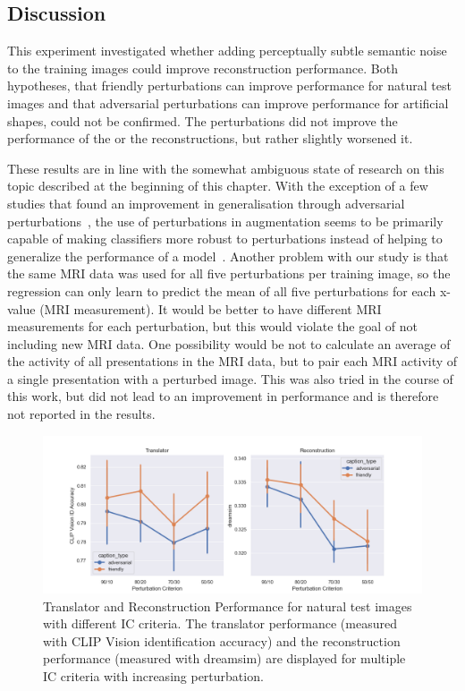 \subsection{Discussion}
This experiment investigated whether adding perceptually subtle semantic noise to the training images could improve reconstruction performance. Both hypotheses, that friendly perturbations can improve performance for natural test images and that adversarial perturbations can improve performance for artificial shapes, could not be confirmed. The perturbations did not improve the performance of the  or the reconstructions, but rather slightly worsened it. 

These results are in line with the somewhat ambiguous state of research on this topic described at the beginning of this chapter. With the exception of a few studies that found an improvement in generalisation through adversarial perturbations~\cite{xieAdversarialExamplesImprove2020,yanEnhancingClassificationPerformance2023}, the use of perturbations in augmentation seems to be primarily capable of making classifiers more robust to perturbations instead of helping to generalize the performance of a model~\cite{goodfellowExplainingHarnessingAdversarial2014,madryDeepLearningModels2019}. Another problem with our study is that the same MRI data was used for all five perturbations per training image, so the regression can only learn to predict the mean of all five perturbations for each x-value (MRI measurement). It would be better to have different MRI measurements for each perturbation, but this would violate the goal of not including new MRI data. One possibility would be not to calculate an average of the activity of all presentations in the MRI data, but to pair each MRI activity of a single presentation with a perturbed image. This was also tried in the course of this work, but did not lead to an improvement in performance and is therefore not reported in the results. 

\begin{figure}[ht]
    \centering
    \includegraphics[width=1\textwidth]{plots/advpert_discussion_explore_pert_ratio_test_translator_and_recon.png}
    \caption[Translator/Reconstruction Performance for natural test images with different IC criteria]{Translator and Reconstruction Performance for natural test images with different IC criteria. The translator performance (measured with CLIP Vision identification accuracy) and the reconstruction performance (measured with dreamsim) are displayed for multiple IC criteria with increasing perturbation.}\label{fig:advpert_discussion_explore_pert_ratio_test_translator_and_recon}
\end{figure}

